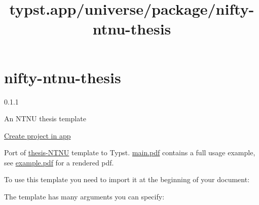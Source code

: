 \title{typst.app/universe/package/nifty-ntnu-thesis}

\label{banner}
\label{template-thumbnail}

\section{nifty-ntnu-thesis}\label{nifty-ntnu-thesis}

{ 0.1.1 }

An NTNU thesis template

\href{/app?template=nifty-ntnu-thesis&version=0.1.1}{Create project in
app}

\label{readme}
Port of \href{https://github.com/COPCSE-NTNU/thesis-NTNU}{thesis-NTNU}
template to Typst.
\href{https://github.com/saimnaveediqbal/thesis-NTNU-typst/blob/main/template/main.typ}{main.pdf}
contains a full usage example, see
\href{https://github.com/saimnaveediqbal/thesis-NTNU-typst/blob/main/example.pdf}{example.pdf}
for a rendered pdf.

To use this template you need to import it at the beginning of your
document:

\begin{Shaded}
\begin{Highlighting}[]
\end{Highlighting}
\end{Shaded}

The template has many arguments you can specify:

